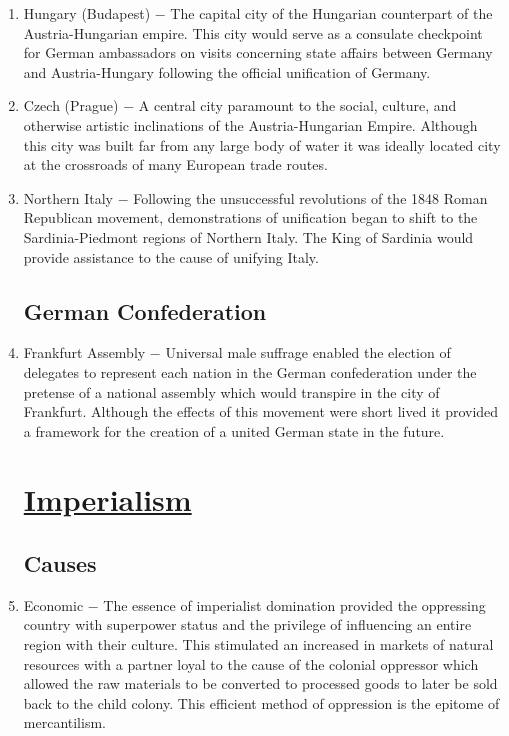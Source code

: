 \documentclass[12pt]{article}
\begin{document}
\begin{enumerate}
\item Hungary (Budapest) $-$ The capital city of the Hungarian counterpart of the Austria-Hungarian empire. This city would serve as a consulate checkpoint for German ambassadors on visits concerning state affairs between Germany and Austria-Hungary following the official unification of Germany.

\item Czech (Prague) $-$ A central city paramount to the social, culture, and otherwise artistic inclinations of the Austria-Hungarian Empire. Although this city was built far from any large body of water it was ideally located city at the crossroads of many European trade routes.

\item Northern Italy $-$ Following the unsuccessful revolutions of the 1848 Roman Republican movement, demonstrations of unification began to shift to the Sardinia-Piedmont regions of Northern Italy. The King of Sardinia would provide assistance to the cause of unifying Italy.

\subsection{German Confederation}


\item Frankfurt Assembly $-$ Universal male suffrage enabled the election of delegates to represent each nation in the German confederation under the pretense of a national assembly which would transpire in the city of Frankfurt. Although the effects of this movement were short lived it provided a framework for the creation of a united German state in the future.

\section{\underline{Imperialism}}

\subsection{Causes}

\item Economic $-$ The essence of imperialist domination provided the oppressing country with superpower status and the privilege of influencing an entire region with their culture. This stimulated an increased in markets of natural resources with a partner loyal to the cause of the colonial oppressor which allowed the raw materials to be converted to processed goods to later be sold back to the child colony. This efficient method of oppression is the epitome of mercantilism.


\end{enumerate}
\end{document}
